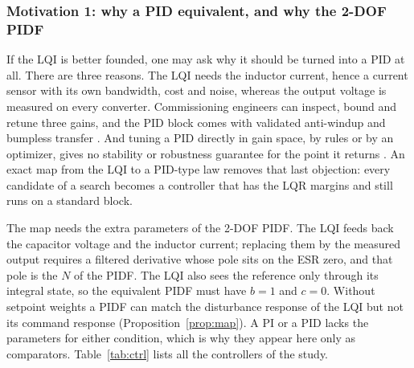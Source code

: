 \subsubsection{Motivation 1: why a PID equivalent, and why the 2-DOF PIDF}
If the LQI is better founded, one may ask why it should be turned into a PID at
all. There are three reasons. The LQI needs the inductor current, hence a
current sensor with its own bandwidth, cost and noise, whereas the output
voltage is measured on every converter. Commissioning engineers can inspect,
bound and retune three gains, and the PID block comes with validated
anti-windup and bumpless transfer \citep{Astrom2006}. And tuning a PID directly
in gain space, by rules or by an optimizer, gives no stability or robustness
guarantee for the point it returns \citep{Ang2005}. An exact map from the LQI to
a PID-type law removes that last objection: every candidate of a search becomes
a controller that has the LQR margins and still runs on a standard block.

The map needs the extra parameters of the 2-DOF PIDF. The LQI feeds back the
capacitor voltage and the inductor current; replacing them by the measured
output requires a filtered derivative whose pole sits on the ESR zero, and that
pole is the $N$ of the PIDF. The LQI also sees the reference only through its
integral state, so the equivalent PIDF must have $b=1$ and $c=0$. Without
setpoint weights a PIDF can match the disturbance response of the LQI but not
its command response (Proposition~\ref{prop:map}). A PI or a PID lacks the
parameters for either condition, which is why they appear here only as
comparators. Table~\ref{tab:ctrl} lists all the controllers of the study.

\begin{table}[t]
\centering
\caption{Controllers used in this study.}
\label{tab:ctrl}
\footnotesize
{}
\end{table}

